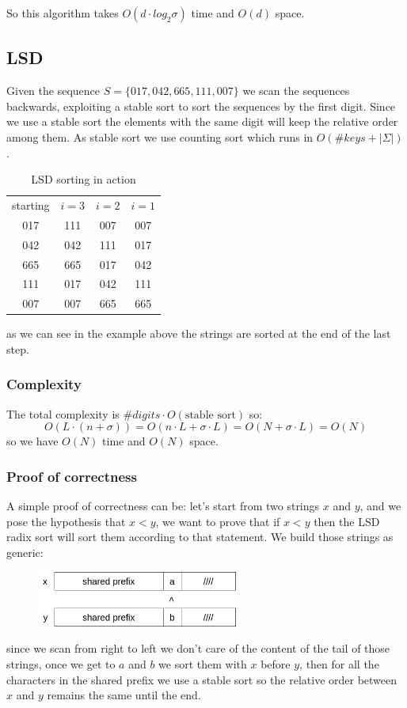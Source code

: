 So this algorithm takes $O(d \cdot log_2 \sigma)$ time and $O(d)$ space.

\subsection{LSD}
Given the sequence $S=\{ 017, 042, 665, 111, 007 \}$ we scan the sequences backwards, exploiting a stable sort to sort the sequences by the first digit. Since we use a stable sort the elements with the same digit will keep the relative order among them.
As stable sort we use counting sort which runs in $O(\# keys + |\Sigma|)$.

\begin{table}[H]
    \centering
    \begin{tabular}{c c c c}
        starting & $i=3$ & $i=2$ & $i=1$  \\
        017 & 111 & 007 & 007 \\
        042 & 042 & 111 & 017 \\
        665 & 665 & 017 & 042 \\
        111 & 017 & 042 & 111 \\
        007 & 007 & 665 & 665 \\
    \end{tabular}
    \caption{LSD sorting in action}
\end{table}
as we can see in the example above the strings are sorted at the end of the last step.

\subsubsection{Complexity}
The total complexity is $\#digits \cdot O(\text{stable sort})$ so:
$$
    O(L \cdot (n + \sigma)) = O(n \cdot L + \sigma \cdot L) = O(N + \sigma \cdot L) = O(N)
$$
so we have $O(N)$ time and $O(N)$ space.

\subsubsection{Proof of correctness}
A simple proof of correctness can be: let's start from two strings $x$ and $y$, and we pose the hypothesis that $x < y$, we want to prove that if $x < y$ then the LSD radix sort will sort them according to that statement.
We build those strings as generic:
\begin{figure}[H]
    \centering
    \includegraphics[width=250px]{images/5_String_sorting/LSD_proof.png}
\end{figure}
since we scan from right to left we don't care of the content of the tail of those strings, once we get to $a$ and $b$ we sort them with $x$ before $y$, then for all the characters in the shared prefix we use a stable sort so the relative order between $x$ and $y$ remains the same until the end.

